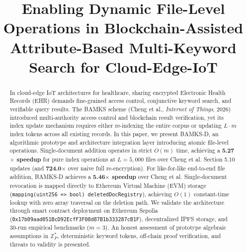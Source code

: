 \documentclass[conference]{IEEEtran}
\begin{document}
\title{Enabling Dynamic File-Level Operations in Blockchain-Assisted Attribute-Based Multi-Keyword Search for Cloud-Edge-IoT}

\author{
\and
{}
}

\maketitle

\begin{abstract}
In cloud-edge IoT architectures for healthcare, sharing encrypted Electronic Health Records (EHR) demands fine-grained access control, conjunctive keyword search, and verifiable query results. The BAMKS scheme (Cheng et al., \textit{Internet of Things}, 2026) introduced multi-authority access control and blockchain result verification, yet its index update mechanism requires either re-indexing the entire corpus or updating $L \cdot m$ index tokens across all existing records. In this paper, we present BAMKS-D, an algorithmic prototype and architecture integration layer introducing atomic file-level operations. Single-document addition operates in strict $O(m)$ time, achieving a \textbf{5.27$\times$ speedup} for pure index operations at $L=5,000$ files over Cheng et al. Section 5.10 updates (and \textbf{724.0$\times$} over naive full re-encryption). For like-for-like end-to-end file addition, BAMKS-D achieves a \textbf{5.46$\times$ speedup} over Cheng et al. Single-document revocation is mapped directly to Ethereum Virtual Machine (EVM) storage (\texttt{mapping(uint256 => bool) deletedDocRegistry}), achieving $O(1)$ constant-time lookup with zero array traversal on the deletion path. We validate the architecture through smart contract deployment on Ethereum Sepolia (\texttt{0x17b09aad051BcD92EcfF3F08d87B1b333287cB1F}), decentralized IPFS storage, and 30-run empirical benchmarks ($m=3$). An honest assessment of prototype algebraic assumptions in $\mathbb{Z}_P^*$, deterministic keyword tokens, off-chain proof verification, and threats to validity is presented.
\end{abstract}
\end{document}
